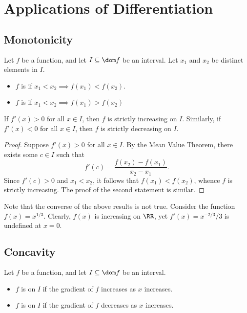 \chapter{Applications of Differentiation}

\section{Monotonicity}

\begin{definition}
    Let $f$ be a function, and let $I \subseteq \dom f$ be an interval. Let $x_1$ and $x_2$ be distinct elements in $I$.
    \begin{itemize}
        \item $f$ is  if $x_1 < x_2 \implies f(x_1) < f(x_2)$.
        \item $f$ is  if  $x_1 < x_2 \implies f(x_1) > f(x_2)$
    \end{itemize}
\end{definition}

\begin{proposition}
    If $f'(x) > 0$ for all $x \in I$, then $f$ is strictly increasing on $I$. Similarly, if $f'(x) < 0$ for all $x \in I$, then $f$ is strictly decreasing on $I$.
\end{proposition}
\begin{proof}
    Suppose $f'(x) > 0$ for all $x \in I$. By the Mean Value Theorem, there exists some $c \in I$ such that \[f'(c) = \frac{f(x_2) - f(x_1)}{x_2 - x_1}.\] Since $f'(c) > 0$ and $x_1 < x_2$, it follows that $f(x_1) < f(x_2)$, whence $f$ is strictly increasing. The proof of the second statement is similar.
\end{proof}

Note that the converse of the above results is not true. Consider the function $f(x) = x^{1/3}$. Clearly, $f(x)$ is increasing on $\RR$, yet $f'(x) = x^{-2/3}/3$ is undefined at $x = 0$.

\section{Concavity}

\begin{definition}
    Let $f$ be a function, and let $I \subseteq \dom f$ be an interval. 
    \begin{itemize}
        \item $f$ is  on $I$ if the gradient of $f$ increases as $x$ increases.
        \item $f$ is  on $I$ if the gradient of $f$ decreases as $x$ increases.
    \end{itemize}
\end{definition}

